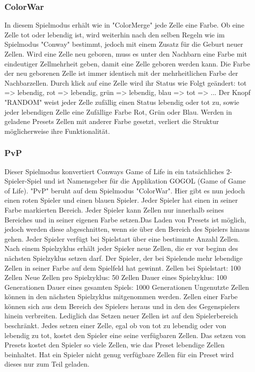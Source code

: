 \documentclass[12pt]{article}
\theoremstyle{plain}
\begin{document}
\begin{linenumbers}
\subsubsection{ColorWar}
In diesem Spielmodus erhält wie in "ColorMerge" jede Zelle eine Farbe. Ob eine Zelle tot oder lebendig ist, wird weiterhin nach den selben Regeln wie im Spielmodus "Conway" bestimmt, jedoch mit einem Zusatz für die Geburt neuer Zellen. Wird eine Zelle neu geboren, muss es unter den Nachbarn eine Farbe mit eindeutiger Zellmehrheit geben, damit eine Zelle geboren werden kann. Die Farbe der neu geborenen Zelle ist immer identisch mit der mehrheitlichen Farbe der Nachbarzellen.
\newline
Durch klick auf eine Zelle wird ihr Status wie Folgt geändert:
\newline
tot => lebendig, rot => lebendig, grün => lebendig, blau => tot => ...
\newline
Der Knopf "RANDOM" weist jeder Zelle zufällig einen Status lebendig oder tot zu, sowie jeder lebendigen Zelle eine Zufällige Farbe Rot, Grün oder Blau. Werden in geladene Presets Zellen mit anderer Farbe gesetzt, verliert die Struktur möglicherweise ihre Funktionalität.

\subsubsection{PvP}
Dieser Spielmodus konvertiert Conways Game of Life in ein tatsächliches 2-Spieler-Spiel und ist Namensgeber für die Applikation GOGOL (Game of Game of Life). "PvP" beruht auf dem Spielmodus "ColorWar". Hier gibt es nun jedoch einen roten Spieler und einen blauen Spieler. Jeder Spieler hat einen in seiner Farbe markierten Bereich. Jeder Spieler kann Zellen nur innerhalb seines Bereiches und in seiner eigenen Farbe setzen.Das Laden von Presets ist möglich, jedoch werden diese abgeschnitten, wenn sie über den Bereich des Spielers hinaus gehen. Jeder Spieler verfügt bei Spielstart über eine bestimmte Anzahl Zellen. Nach einem Spielzyklus erhält jeder Spieler neue Zellen, die er vor beginn des nächsten Spielzyklus setzen darf. Der Spieler, der bei Spielende mehr lebendige Zellen in seiner Farbe auf dem Spielfeld hat gewinnt.
\newline
Zellen bei Spielstart: 100 Zellen
Neue Zellen pro Spielzyklus: 50 Zellen
Dauer eines Spielzyklus: 100 Generationen
Dauer eines gesamten Spiels: 1000 Generationen
\newline
Ungenutzte Zellen können in den nächsten Spielzyklus mitgenommen werden. Zellen einer Farbe können sich aus dem Bereich des Spielers heraus und in den des Gegenspielers hinein verbreiten. Lediglich das Setzen neuer Zellen ist auf den Spielerbereich beschränkt. Jedes setzen einer Zelle, egal ob von tot zu lebendig oder von lebendig zu tot, kostet den Spieler eine seine verfügbaren Zellen. Das setzen von Presets kostet den Spieler so viele Zellen, wie das Preset lebendige Zellen beinhaltet. Hat ein Spieler nicht genug verfügbare Zellen für ein Preset wird dieses nur zum Teil geladen.


\end{linenumbers}
\end{document}
